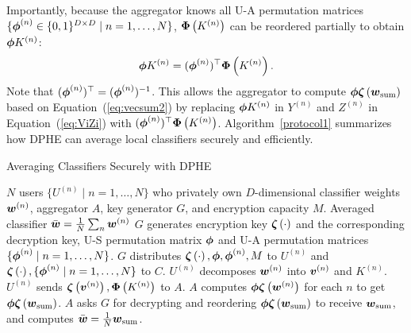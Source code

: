 \documentclass[10pt,twocolumn,letterpaper]{article}
\def\sub#1{_{\rm #1}}
\def\vct#1{\mbox{\boldmath $#1$}}
\def\ui#1{^{(#1)}}
\def\perm{\vct{\phi}}
\def\he#1{\vct{\zeta}\left(#1\right)}
\def\dperm#1{\vct{\Phi}\left(#1\right)}
\begin{document}
Importantly, because the aggregator knows all U-A permutation matrices $\{\perm\ui{n}\in\{0, 1\}^{D\times D}\mid n= 1,\dots,N\}$, $\dperm{K\ui{n}}$ can be reordered partially to obtain $\perm K\ui{n}$: 
\begin{equation}
\perm K\ui{n} = (\perm\ui{n})^\top \dperm{K\ui{n}}.
\end{equation}
Note that $(\perm\ui{n})^\top=(\perm\ui{n})^{-1}$. This allows the aggregator to compute $\perm\he{\vct{w}\sub{sum}}$ based on Equation~(\ref{eq:vecsum2}) by replacing $\perm K\ui{n}$ in $Y\ui{n}$ and $Z\ui{n}$ in Equation~(\ref{eq:ViZi}) with $(\perm\ui{n})^\top \dperm{K\ui{n}}$.
Algorithm~\ref{protocol1} summarizes how DPHE can average local classifiers securely and efficiently.

\begin{algorithm}[t]
\caption{Averaging Classifiers Securely with DPHE}
\label{protocol1}
\begin{algorithmic}[1]
\REQUIRE $N$ users $\{U\ui{n}\mid n=1,\dots,N\}$ who privately own $D$-dimensional classifier weights $\vct{w}\ui{n}$, aggregator $A$, key generator $G$, and encryption capacity $M$.
\ENSURE Averaged classifier $\bar{\vct{w}}=\frac{1}{N}\sum_n\vct{w}\ui{n}$
\STATE $G$ generates encryption key $\he{\cdot}$ and the corresponding decryption key, U-S permutation matrix $\perm$ and U-A permutation matrices $\{\perm\ui{n}\mid n=1,\dots,N\}$.
\STATE $G$ distributes $\he{\cdot},\perm,\perm\ui{n}, M$ to $U\ui{n}$ and $\he{\cdot},\{\perm\ui{n}\mid n=1,\dots,N\}$ to $C$.
\STATE $U\ui{n}$ decomposes $\vct{w}\ui{n}$ into $\vct{v}\ui{n}$ and $K\ui{n}$. %
\STATE $U\ui{n}$ sends $\he{\vct{v}\ui{n}}, \dperm{K\ui{n}}$ to $A$.
\STATE $A$ computes $\perm\he{\vct{w}\ui{n}}$ for each $n$ to get $\perm\he{\vct{w}\sub{sum}}$. %
\STATE $A$ asks $G$ for decrypting and reordering $\perm\he{\vct{w}\sub{sum}}$ to receive $\vct{w}\sub{sum}$, and computes $\bar{\vct{w}}=\frac{1}{N}\vct{w}\sub{sum}$.
\end{algorithmic}
\end{algorithm}
\end{document}
